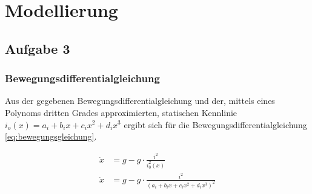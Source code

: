 \chapter{Modellierung}\label{chap:Modellierung}
\section{Aufgabe 3}\label{sec:Aufgabe3}
	\subsection*{Bewegungsdifferentialgleichung}\label{sub:diffeq}
	Aus der gegebenen Bewegungsdifferentialgleichung und der, mittels eines Polynoms dritten Grades approximierten, statischen Kennlinie $i_o(x) = a_i + b_ix +c_ix^2 + d_ix^3$ ergibt sich für die Bewegungsdifferentialgleichung \ref{eq:bewegungsgleichung}. 
	
	\begin{align}\label{eq:bewegungsgleichung}
		\ddot{x} &= g - g \cdot \frac{i^2}{i_0^2(x)} \nonumber\\
		\ddot{x} &= g - g \cdot \frac{i^2}{(a_i + b_ix +c_ix^2 + d_ix^3)^2}
	\end{align} 



